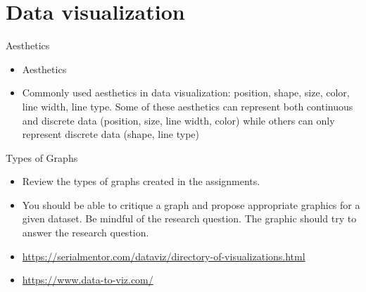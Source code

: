 \documentclass[10pt]{beamer}\usepackage[]{graphicx}\usepackage[]{color}
\begin{document}
\section{Data visualization}

\begin{frame}{Aesthetics}
	\begin{itemize}
		\setlength\itemsep{.51em}
		\item Aesthetics
		\pause 
		\item Commonly used aesthetics in data visualization: position, shape, size, color, line width, line type. Some of these aesthetics can represent both continuous and discrete data (position, size, line width, color) while others can only represent discrete data (shape, line type)	
	\end{itemize}
\end{frame}

\begin{frame}{Types of Graphs}
	\begin{itemize}
		\item Review the types of graphs created in the assignments.
		\item You should be able to critique a graph and propose appropriate graphics for a given dataset. Be mindful of the research question. The graphic should try to answer the research question. 
		\item \url{https://serialmentor.com/dataviz/directory-of-visualizations.html}
		\item \url{https://www.data-to-viz.com/}
	\end{itemize}
\end{frame}
\end{document}
